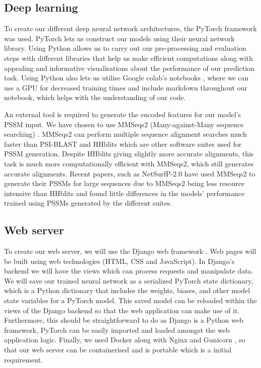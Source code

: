 \documentclass{l4proj}
\begin{document}
\subsection{Deep learning}

To create our different deep neural network architectures, the PyTorch framework \citep{pytorch} was used. PyTorch lets us construct our models using their neural network library. Using Python allows us to carry out our pre-processing and evaluation steps with different libraries that help us make efficient computations along with appealing and informative visualisations about the performance of our prediction task. Using Python also lets us utilise Google colab’s notebooks \citep{Bisong:19}, where we can use a GPU for decreased training times and include markdown throughout our notebook, which helps with the understanding of our code.

An external tool is required to generate the encoded features for our model's PSSM input. We have chosen to use MMSeqs2 (Many-against-Many sequence searching) \citep{Steinegger:17}. MMSeqs2 can perform multiple sequence alignment searches much faster than PSI-BLAST \citep{Altschul:97} and HHblits \citep{Remmert:12} which are other software suites used for PSSM generation. Despite HHblits giving slightly more accurate alignments, this task is much more computationally efficient with MMSeqs2, which still generates accurate alignments. Recent papers, such as NetSurfP-2.0 \citep{Klausen:19} have used MMSeqs2 to generate their PSSMs for large sequences due to MMSeqs2 being less resource intensive than HHblits and found little differences in the models' performance trained using PSSMs generated by the different suites.

\subsection{Web server}

To create our web server, we will use the Django web framework \citep{Django:05}. Web pages will be built using web technologies (HTML, CSS and JavaScript). In Django’s backend we will have the views which can process requests and manipulate data. We will save our trained neural network as a serialized PyTorch state dictionary, which is a Python dictionary that includes the weights, biases, and other model state variables for a PyTorch model. This saved model can be reloaded within the views of the Django backend so that the web application can make use of it. Furthermore, this should be straightforward to do as Django is a Python web framework, PyTorch can be easily imported and loaded amongst the web application logic. Finally, we used Docker \citep{Docker:14} along with Nginx \citep{Reese:08} and Gunicorn \citep{gunicorn:wiki}, so that our web server can be containerised and is portable which is a initial requirement. 
\end{document}
